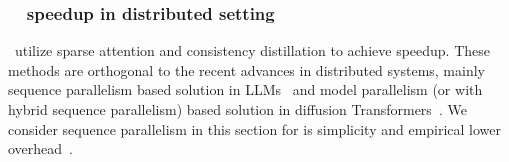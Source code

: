 \subsubsection{~\methodname~speedup in distributed setting}
\label{sec:system_parallel}
\methodname~utilize sparse attention and consistency distillation to achieve speedup. These methods are orthogonal to the recent advances in distributed systems, mainly sequence parallelism based solution in LLMs~\citep{liu2023ring, li2024distflashattn, jacobs2023deepspeed} and model parallelism (or with hybrid sequence parallelism) based solution in diffusion Transformers~\citep{li2024distrifusion, wang2024pipefusion, chen2024asyncdiff}. We consider sequence parallelism in this section for is simplicity and empirical lower overhead~\citep{li2024distflashattn, li2024distrifusion, xue2024longvila}.



